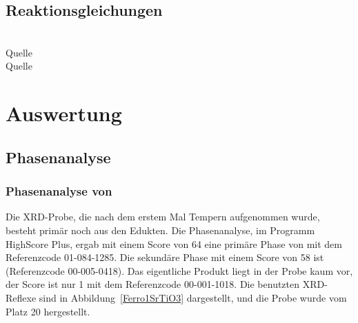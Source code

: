 \documentclass[12pt, a4paper]{article}
\begin{document}
\subsection{Reaktionsgleichungen }
\begin{center}
\\
 Quelle\cite{Reaktionsgleichungen}\\
 Quelle\cite{Reaktionsgleichungen}


\end{center}
\newpage
\section{Auswertung}
\subsection{Phasenanalyse}
\subsubsection{\texorpdfstring{Phasenanalyse von }{Phasenanalyse von SrTiO3}}
Die XRD-Probe, die nach dem erstem Mal Tempern aufgenommen wurde, besteht primär noch aus den Edukten. 
Die Phasenanalyse, im Programm HighScore Plus, ergab mit einem Score von 64 eine primäre Phase von  mit dem Referenzcode 01-084-1285.
Die sekundäre Phase mit einem Score von 58 ist  (Referenzcode 00-005-0418). Das eigentliche Produkt  liegt in der Probe
kaum vor, der Score ist nur 1 mit dem Referenzcode 00-001-1018. Die benutzten XRD-Reflexe sind in \mbox{Abbildung \ref{Ferro1SrTiO3}} dargestellt, und die Probe wurde vom Platz 20 hergestellt.
\end{document}
